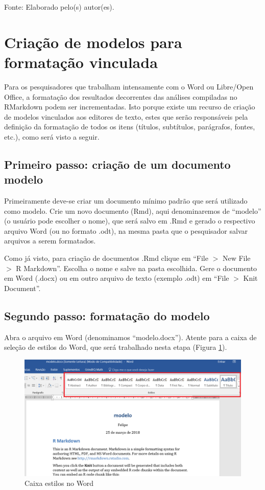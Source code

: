 \documentclass[12pt,portuguese,oneside]{book}
\begin{document}
Fonte: Elaborado pelo(s) autor(es).

\section{Criação de modelos para formatação
vinculada}\label{criacao-de-modelos-para-formatacao-vinculada}

Para os pesquisadores que trabalham intensamente com o Word ou
Libre/Open Office, a formatação dos resultados decorrentes das análises
compiladas no RMarkdown podem ser incrementadas. Isto porque existe um
recurso de criação de modelos vinculados aos editores de texto, estes
que serão responsáveis pela definição da formatação de todos os itens
(títulos, subtítulos, parágrafos, fontes, etc.), como será visto a
seguir.

\subsection{Primeiro passo: criação de um documento
modelo}\label{primeiro-passo-criacao-de-um-documento-modelo}

Primeiramente deve-se criar um documento mínimo padrão que será
utilizado como modelo. Crie um novo documento (Rmd), aqui denominaremos
de ``modelo'' (o usuário pode escolher o nome), que será salvo em .Rmd e
gerado o respectivo arquivo Word (ou no formato .odt), na mesma pasta
que o pesquisador salvar arquivos a serem formatados.

Como já visto, para criação de documentos .Rmd clique em ``File \(>\)
New File \(>\) R Markdown''. Escolha o nome e salve na pasta escolhida.
Gere o documento em Word (.docx) ou em outro arquivo de texto (exemplo
.odt) em ``File \(>\) Knit Document''.

\subsection{Segundo passo: formatação do
modelo}\label{segundo-passo-formatacao-do-modelo}

Abra o arquivo em Word (denominamos ``modelo.docx''). Atente para a
caixa de seleção de estilos do Word, que será trabalhado nesta etapa
(Figura \ref{fig:rmarkestilos}).

\begin{figure}[H]

{\centering \includegraphics[width=0.8\linewidth]{rmarkestilos} 

}

\caption{Caixa estilos no Word}\label{fig:rmarkestilos}
\end{figure}
\end{document}
